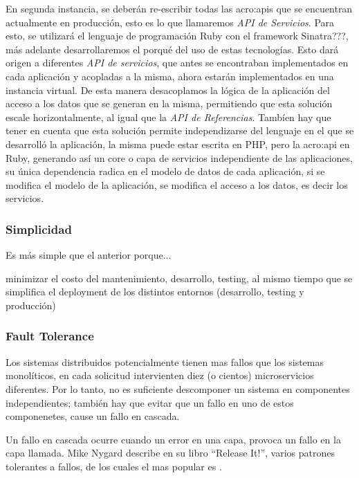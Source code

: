 En segunda instancia, se deberán re-escribir todas las \glspl{acro:api} que se encuentran actualmente en producción, esto es lo que llamaremos \textit{API de Servicios}.  Para esto, se utilizará el lenguaje de programación Ruby con el framework Sinatra???, más adelante desarrollaremos el porqué del uso de estas tecnologías.  Esto dará origen a diferentes \textit{API de servicios}, que antes se encontraban implementados en cada aplicación y acopladas a la misma, ahora estarán implementados en una instancia virtual.
De esta manera desacoplamos la lógica de la aplicación del acceso a los datos que se generan en la misma, permitiendo que esta solución escale horizontalmente, al igual que la \textit{API de Referencias}.
Tambíen hay que tener en cuenta que esta solución permite independizarse del lenguaje en el que se desarrolló la aplicación, la misma puede estar escrita en PHP, pero la \gls{acro:api} en Ruby, generando así un core o capa de servicios independiente de las aplicaciones, su única dependencia radica en el modelo de datos de cada aplicación, si se modifica el modelo de la aplicación, se modifica el acceso a los datos, es decir los servicios.


\subsubsection{Simplicidad}

Es más simple que el anterior porque...

minimizar el costo del mantenimiento, desarrollo, testing, al mismo tiempo que se simplifica el deployment de los distintos entornos (desarrollo, testing y producción)

\subsubsection{Fault Tolerance}

Los sistemas distribuidos potencialmente tienen mas fallos que los sistemas monolíticos, en cada solicitud intervienten diez (o cientos) microservicios diferentes.\cite[p.~48]{stin2015}  Por lo tanto, no es suficiente descomponer un sistema en componentes  independientes; también hay que evitar que un fallo en uno de estos componenetes, cause un fallo en cascada.\cite[p.~4]{stin2015}

Un fallo en cascada ocurre cuando un error en una capa, provoca un fallo en la capa llamada.\cite[p.~65]{nygard2007}  Mike Nygard describe en su libro ``Release It!''\cite{nygard2007}, varios patrones tolerantes a fallos, de los cuales el mas popular es .

